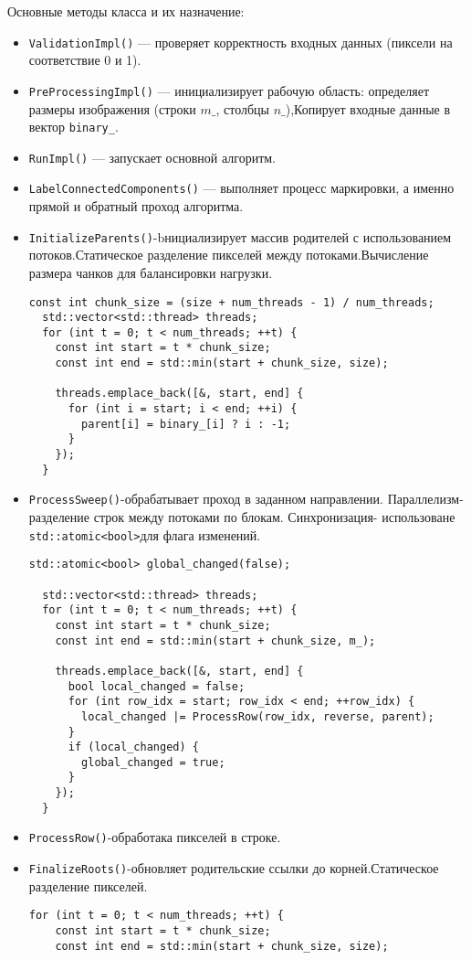 \documentclass[12pt]{extarticle}
\begin{document}
Основные методы класса и их назначение:
\begin{itemize}
   \item \texttt{ValidationImpl()} — проверяет корректность входных данных (пиксели на соответствие 0 и 1).
   \item \texttt{PreProcessingImpl()} — инициализирует рабочую область: определяет размеры изображения (строки $m\_$, столбцы $n\_$),Копирует входные данные в вектор \texttt{binary\_}.
   \item \texttt{RunImpl()} — запускает основной алгоритм.
   \item \texttt{LabelConnectedComponents()} — выполняет процесс маркировки, а именно прямой и обратный проход алгоритма.
   \item \texttt{InitializeParents()}-bнициализирует массив родителей с использованием потоков.Статическое разделение пикселей между потоками.Вычисление размера чанков для балансировки нагрузки.
   \begin{lstlisting}[caption={Статическое разделение пикселей и вычисление размера чанков},label={all7}]
  const int chunk_size = (size + num_threads - 1) / num_threads;
  std::vector<std::thread> threads;
  for (int t = 0; t < num_threads; ++t) {
    const int start = t * chunk_size;
    const int end = std::min(start + chunk_size, size);

    threads.emplace_back([&, start, end] {
      for (int i = start; i < end; ++i) {
        parent[i] = binary_[i] ? i : -1;
      }
    });
  }
\end{lstlisting}
  \item \texttt{ProcessSweep()}-обрабатывает проход в заданном направлении. Параллелизм-разделение строк между потоками по блокам. Синхронизация- использоване \texttt{std::atomic<bool>}для флага изменений.
  \begin{lstlisting}[caption={Параллелизм в методе ProcessSweep},label={all8}]
 std::atomic<bool> global_changed(false);

  std::vector<std::thread> threads;
  for (int t = 0; t < num_threads; ++t) {
    const int start = t * chunk_size;
    const int end = std::min(start + chunk_size, m_);

    threads.emplace_back([&, start, end] {
      bool local_changed = false;
      for (int row_idx = start; row_idx < end; ++row_idx) {
        local_changed |= ProcessRow(row_idx, reverse, parent);
      }
      if (local_changed) {
        global_changed = true;
      }
    });
  }
  \end{lstlisting}
  \item \texttt{ProcessRow()}-обработака пикселей в строке.
  \item \texttt{FinalizeRoots()}-обновляет родительские ссылки до корней.Статическое разделение пикселей.
  \begin{lstlisting}[caption={Обновление родительских ссылок в методе FinalizeRoots},label={all9}]
   for (int t = 0; t < num_threads; ++t) {
    const int start = t * chunk_size;
    const int end = std::min(start + chunk_size, size);


\end{lstlisting}
\end{itemize}
\end{document}
